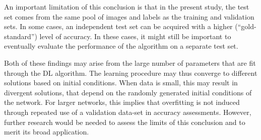 An important limitation of this conclusion is that in the present study, 
the test set comes from the same pool of images and labels as the training 
and validation sets. In some cases, an independent test set can be acquired 
with a higher (``gold-standard'') level of accuracy. In these cases, it might
still be important to eventually evaluate the performance of the algorithm 
on a separate test set. 

Both of these findings may arise from the large number of parameters that are
fit through the DL algorithm. The learning procedure may thus converge to
different solutions based on initial conditions. When data is small, this may
result in divergent solutions, that depend on the randomly generated initial
conditions of the network. For larger networks, this implies that overfitting is
not induced through repeated use of a validation data-set in accuracy
assessments. However, further research would be needed to assess the limits of
this conclusion and to merit its broad application.
